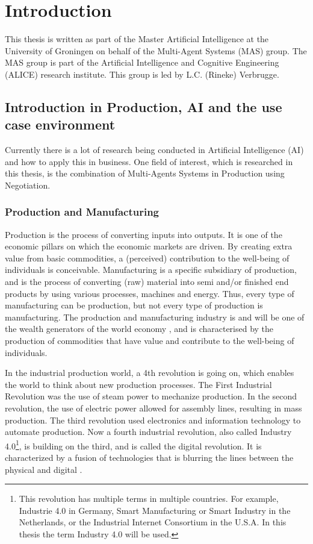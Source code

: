 \chapter{Introduction}
\label{ch:intro}
This thesis is written as part of the Master Artificial Intelligence at the University of Groningen on behalf of the Multi-Agent Systems (MAS) group. The MAS group is part of the Artificial Intelligence and Cognitive Engineering (ALICE) research institute. This group is led by L.C. (Rineke) Verbrugge.  

\section{Introduction in Production, AI and the use case environment}

Currently there is a lot of research being conducted in Artificial Intelligence (AI) and how to apply this in business. One field of interest, which is researched in this thesis, is the combination of Multi-Agents Systems in Production using Negotiation.

\subsection{Production and Manufacturing}
Production is the process of converting inputs into outputs. It is one of the economic pillars on which the economic markets are driven. By creating extra value from basic commodities, a (perceived) contribution to the well-being of individuals is conceivable. Manufacturing is a specific subsidiary of production, and is the process of converting (raw) material into semi and/or finished end products by using various processes, machines and energy. Thus, every type of manufacturing can be production, but not every type of production is manufacturing. The production and manufacturing industry is and will be one of the wealth generators of the world economy \citep{monostori2006agent}, and is characterised by the production of commodities that have value and contribute to the well-being of individuals.

In the industrial production world, a 4th revolution is going on, which enables the world to think about new production processes. The First Industrial Revolution was the use of steam power to mechanize production. In the second revolution, the use of electric power allowed for assembly lines, resulting in mass production. The third revolution used electronics and information technology to automate production. Now a fourth industrial revolution, also called Industry 4.0\footnote{This revolution has multiple terms in multiple countries. For example, Industrie 4.0 in Germany, Smart Manufacturing or Smart Industry in the Netherlands, or the Industrial Internet Consortium in the U.S.A. In this thesis the term Industry 4.0 will be used.}, is building on the third, and is called the digital revolution. It is characterized by a fusion of technologies that is blurring the lines between the physical and digital \citep{leitao2016smart}.


